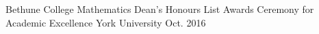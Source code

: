 


\begin{cvhonors}

  \cvhonor
    {Bethune College Mathematics Dean's Honours List} %
    {Awards Ceremony for Academic Excellence} %
    {York University} %
    {Oct. 2016} %




\end{cvhonors}





